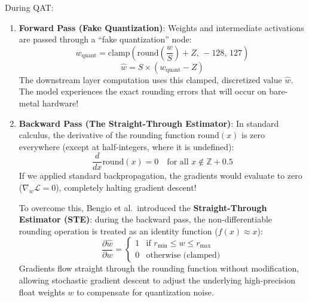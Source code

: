 During QAT:
\begin{enumerate}
    \item \textbf{Forward Pass (Fake Quantization)}: Weights and intermediate activations are passed through a ``fake quantization'' node:
    \begin{equation}
    w_{\text{quant}} = \text{clamp}\left( \text{round}\left( \frac{w}{S} \right) + Z,\, -128,\, 127 \right)
    \end{equation}
    \begin{equation}
    \hat{w} = S \times (w_{\text{quant}} - Z)\label{eq:fake_quant}
    \end{equation}
    The downstream layer computation uses this clamped, discretized value $\hat{w}$. The model experiences the exact rounding errors that will occur on bare-metal hardware!
    \item \textbf{Backward Pass (The Straight-Through Estimator)}: In standard calculus, the derivative of the rounding function $\text{round}(x)$ is zero everywhere (except at half-integers, where it is undefined):
    \begin{equation*}
    \frac{d}{dx} \text{round}(x) = 0 \quad \text{for all } x \notin \mathbb{Z} + 0.5
    \end{equation*}
    If we applied standard backpropagation, the gradients would evaluate to zero ($\nabla_w \mathcal{L} = 0$), completely halting gradient descent!
    
    To overcome this, Bengio et al.\ introduced the \textbf{Straight-Through Estimator (STE)}: during the backward pass, the non-differentiable rounding operation is treated as an identity function ($f(x) \approx x$):
    \begin{equation}
    \frac{\partial \hat{w}}{\partial w} = \begin{cases}
    1 & \text{if } r_{\min} \le w \le r_{\max} \\
    0 & \text{otherwise (clamped)}
    \end{cases}\label{eq:ste_gradient}
    \end{equation}
    Gradients flow straight through the rounding function without modification, allowing stochastic gradient descent to adjust the underlying high-precision float weights $w$ to compensate for quantization noise.
\end{enumerate}

